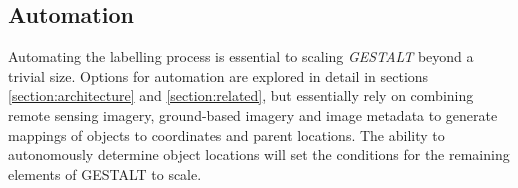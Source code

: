 \subsection{Automation}
Automating the labelling process is essential to scaling \textit{GESTALT} beyond a trivial size. 
Options for automation are explored in detail in sections \ref{section:architecture} and \ref{section:related}, but essentially rely on combining remote sensing imagery, ground-based imagery and image metadata to generate mappings of objects to coordinates and parent locations.
The ability to autonomously determine object locations will set the conditions for the remaining elements of GESTALT to scale.



